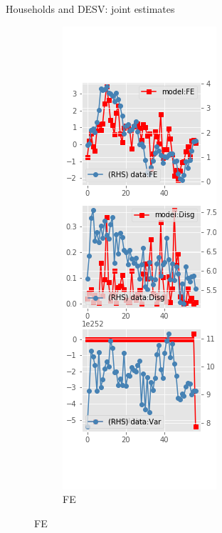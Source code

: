 \documentclass{beamer}
\begin{document}
\begin{frame}{Households and DESV: joint estimates}
	\begin{figure}[ht]
		\label{DESV_diag_joint_SCE}
		\begin{subfigure}[b]{0.2\textwidth}
			\centering
			\caption{FE}
			\includegraphics[width=\textwidth, height = 0.8\textheight]{figuresDraft/sce_de_est_sv_joint_diag0.png}

\end{subfigure}
\end{figure}
\end{frame}
\end{document}
